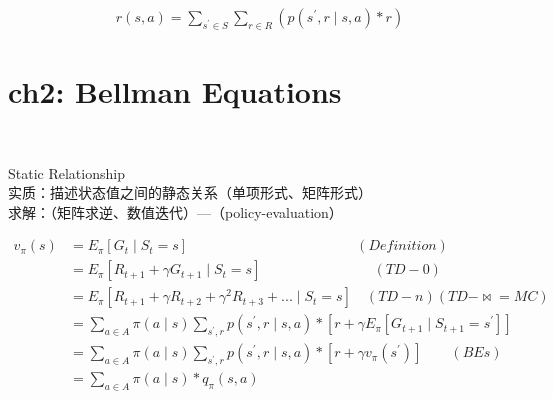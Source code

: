 \documentclass{article}
\begin{document}
\begin{align*}
    r(s, a) = \sum_{s^{\prime} \in S} 
    \sum_{r \in R} 
    \left( p \left( s^{\prime}, r \mid s, a \right) * r \right) 
\end{align*}


\newpage
\section*{ch2: Bellman Equations}


~ \\[3pt]
\begin{CJK}{UTF8}{gbsn}
    Static Relationship \\[3pt]
    实质：描述状态值之间的静态关系（单项形式、矩阵形式） \\[3pt]
    求解：（矩阵求逆、数值迭代）---（policy-evaluation） \\[3pt]
\end{CJK}


\begin{align*}
    v_{\pi}(s) 
      &= E_{\pi} \left[ G_{t} \mid S_{t}=s \right] 
         \qquad \qquad \qquad \qquad \qquad \qquad (Definition) \\[3pt]
      &= E_{\pi} \left[ R_{t+1} + \gamma G_{t+1} \mid S_{t}=s \right] 
         \qquad \qquad \qquad \qquad (TD-0) \\[3pt]
      &= E_{\pi} \left[ R_{t+1} + \gamma R_{t+2} + \gamma^2 R_{t+3} + ... 
         \mid S_{t}=s \right] 
         \quad (TD-n)(TD-\Join =MC) \\[3pt]
      &= \sum_{a \in A} \pi(a \mid s) 
         \sum_{s^{\prime}, r} 
         p \left( s^{\prime}, r \mid s, a \right) * 
         \left[ r + \gamma E_{\pi} 
         \left[ G_{t+1} \mid S_{t+1}=s^{\prime} \right] \right] \\[3pt]
      &= \sum_{a \in A} \pi(a \mid s) 
         \sum_{s^{\prime}, r} 
         p \left( s^{\prime}, r \mid s, a \right) * 
         \left[ r + \gamma 
         v_{\pi} \left( s^{\prime} \right) \right] 
         \qquad (BEs) \\[3pt]
      &= \sum_{a \in A} 
         \pi(a \mid s) * q_{\pi}(s, a) \\[3pt]
\end{align*}
\end{document}
